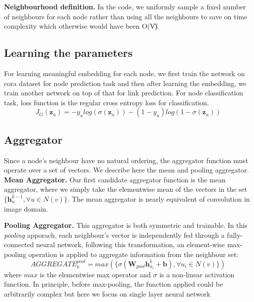 \documentclass[review]{elsarticle}
\begin{document}
\textbf{Neighbourhood definition.} In the code, we uniformly sample a fixed number of neighbours for each node rather than using all the neighbours to save on time complexity which otherwise would have been O(\|V\|).
\subsection{Learning the parameters}
\noindent For learning meaningful embedding for each node, we first train the network on cora dataset for node prediction task and then after learning the embedding, we train another network on top of that for link prediction. For node classification task, loss function is the regular cross entropy loss for classification.
\begin{equation}
    J_{G}(\mathbf{z}_{u}) = -y_{u}log(\sigma (\mathbf{z}_{u})) - (1-y_{u})log(1-\sigma (\mathbf{z}_{u})) 
\end{equation}
\subsection{Aggregator}
\noindent Since a node's neighbour have no natural ordering, the aggregator function must operate over a set of vectors. We describe here the mean and pooling aggregator.\\
\textbf{Mean Aggregator.} Our first candidate aggregator function is the mean aggregator, where we simply take the elementwise mean of the vectors in the set $\{\mathbf{h}_{u}^{k-1}, \forall u \in N(v)\}$. The mean aggregator is nearly equivalent of convolution in image domain.

\noindent \textbf{Pooling Aggregator.} This aggregator is both symmetric and trainable. In this \textit{pooling} apporach, each neighbour's vector is independently fed through a fully-connected neural network, following this transformation, an element-wise max-pooling operation is applied to aggregate information from the neighbour set:
\begin{equation}
    AGGREGATE_{k}^{pool} = max(\{\sigma (\mathbf{W}_{pool}\mathbf{h}_{u_{i}}^{k}+\mathbf{b}), \forall u_{i} \in N(v)\})
\end{equation}
where $max$ is the elementwise max operator and $\sigma$ is a non-linear activation function. In principle, before max-pooling, the function applied could be arbitrarily complex but here we focus on single layer neural network
\end{document}
